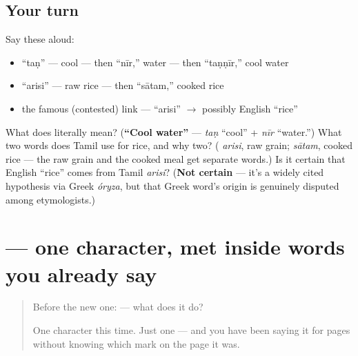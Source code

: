\subsection*{Your turn}
Say these aloud:

\begin{itemize}
\raggedright
  \item \textquotedblleft{}taṇ\textquotedblright{} — cool — then \textquotedblleft{}nīr,\textquotedblright{} water — then \textquotedblleft{}taṇṇīr,\textquotedblright{} cool water
  \item \textquotedblleft{}arisi\textquotedblright{} — raw rice — then \textquotedblleft{}sātam,\textquotedblright{} cooked rice
  \item the famous (contested) link — \textquotedblleft{}arisi\textquotedblright{} $\to$ possibly English \textquotedblleft{}rice\textquotedblright{}
\end{itemize}

\begin{tcolorbox}[breakable,colback=teal!4,colframe=teal!35!black,title={Before you move on}]
What does \textbf{} literally mean? (\textbf{\textquotedblleft{}Cool water\textquotedblright{}} — \emph{taṇ} \textquotedblleft{}cool\textquotedblright{} + \emph{nīr} \textquotedblleft{}water.\textquotedblright{}) What two words does Tamil use for rice, and why two? (\textbf{} \emph{arisi}, raw grain; \textbf{} \emph{sātam}, cooked rice — the raw grain and the cooked meal get separate words.) Is it certain that English \textquotedblleft{}rice\textquotedblright{} comes from Tamil \emph{arisi}? (\textbf{Not certain} — it's a widely cited hypothesis via Greek \emph{óryza}, but that Greek word's origin is genuinely disputed among etymologists.)
\end{tcolorbox}
\section[\texorpdfstring{\ta{அ} (a)}{அ (a)}]{ — one character, met inside words you already say}

\label{lesson:TA-S119-letter-a}



\begin{quote}
Before the new one:  — what does it do?

One character this time. Just one — and you have been saying it for pages without knowing which mark on the page it was.
\end{quote}

